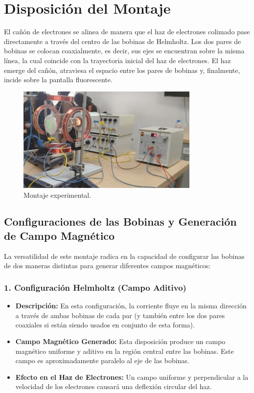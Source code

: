 \section{Disposición del Montaje}
El cañón de electrones se alinea de manera que el haz de electrones colimado
pase directamente a través del centro de las bobinas de Helmholtz. Los dos pares
de bobinas se colocan coaxialmente, es decir, sus ejes se encuentran sobre la
misma línea, la cual coincide con la trayectoria inicial del haz de electrones.
El haz emerge del cañón, atraviesa el espacio entre los pares de bobinas y,
finalmente, incide sobre la pantalla fluorescente.

\begin{figure}[htbp]
  \centering
  \includegraphics[width=0.8\textwidth]{Sections/Figures/Montaje.jpeg}
  \caption{Montaje experimental.}
  \label{fig:nombre_descriptivo_de_la_imagen}
\end{figure}

\subsection{Configuraciones de las Bobinas y Generación de Campo Magnético}
La versatilidad de este montaje radica en la capacidad de configurar las bobinas
de dos maneras distintas para generar diferentes campos magnéticos:

\subsubsection{1. Configuración Helmholtz (Campo Aditivo)}
\begin{itemize}
  \item \textbf{Descripción:} En esta configuración, la corriente fluye en la
    misma dirección a través de ambas bobinas de cada par (y también
    entre los dos pares coaxiales si están siendo usados en conjunto de esta
    forma).
  \item \textbf{Campo Magnético Generado:} Esta disposición produce un campo
    magnético uniforme y aditivo en la región central entre las bobinas. Este
    campo es aproximadamente paralelo al eje de las bobinas.
  \item \textbf{Efecto en el Haz de Electrones:} Un campo uniforme y
    perpendicular a la velocidad de los electrones causará una deflexión
    circular del haz.
\end{itemize}

